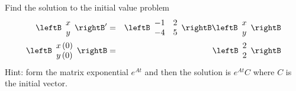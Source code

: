 \begin{enumialphparenastyle}
\begin{ex}
Find the solution to the initial value problem 
\begin{eqnarray*}
\leftB 
\begin{array}{c}
x \\ 
y 
\end{array} 
\rightB ^{\prime } &=&\leftB 
\begin{array}{rr}
-1 & 2 \\ 
-4 & 5 
\end{array} 
\rightB \leftB 
\begin{array}{c}
x \\ 
y 
\end{array} 
\rightB \\
\leftB 
\begin{array}{c}
x\left( 0\right) \\ 
y\left( 0\right) 
\end{array} 
\rightB &=&\leftB 
\begin{array}{r}
2 \\ 
2 
\end{array} 
\rightB
\end{eqnarray*} 
Hint: form the matrix exponential $e^{At}$ and then the solution is $e^{At}C$ where $C$ is the initial vector. 
\end{ex}

\end{enumialphparenastyle}
